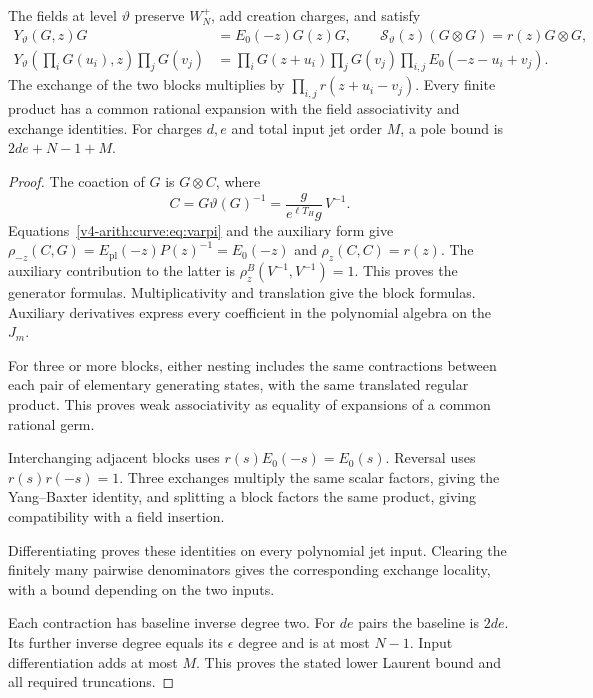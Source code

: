 \begin{theorem}\label{v4-arith:curve:thm:jet-fields}
The fields at level $\vartheta$ preserve $W_N^+$, add
creation charges, and satisfy
\begin{align}
 Y_\vartheta(G,z)G&=E_0(-z)G(z)G,\qquad
 \mathcal S_\vartheta(z)(G\otimes G)=r(z)G\otimes G,
       \label{v4-arith:curve:eq:jet-generator}\\
 Y_\vartheta\left(\prod_iG(u_i),z\right)\prod_jG(v_j)
 &=\prod_iG(z+u_i)\prod_jG(v_j)
       \prod_{i,j}E_0(-z-u_i+v_j).
       \label{v4-arith:curve:eq:jet-blocks}
\end{align}
The exchange of the two blocks multiplies by
$\prod_{i,j}r(z+u_i-v_j)$.
Every finite product has a common rational expansion with
the field associativity and exchange identities.
For charges $d,e$ and total input jet order $M$, a pole
bound is $2de+N-1+M$.
\end{theorem}
\begin{proof}
The coaction of $G$ is $G\otimes C$, where
\[
 C=G\vartheta(G)^{-1}
   =\frac{g}{e^{\ell T_H}g}\,V^{-1}.
\]
Equations~\eqref{v4-arith:curve:eq:varpi} and the auxiliary
form give
$\rho_{-z}(C,G)=E_{\mathrm{pl}}(-z)P(z)^{-1}=E_0(-z)$
and $\rho_z(C,C)=r(z)$.
The auxiliary contribution to the latter is
$\rho^B_z(V^{-1},V^{-1})=1$.
This proves the generator formulas.
Multiplicativity and translation give the block formulas.
Auxiliary derivatives express every coefficient in the
polynomial algebra on the $J_m$.

For three or more blocks, either nesting includes the same
contractions between each pair of elementary generating
states, with the same translated regular product.
This proves weak associativity as equality of expansions
of a common rational germ.

Interchanging adjacent blocks
uses $r(s)E_0(-s)=E_0(s)$.
Reversal uses $r(s)r(-s)=1$.
Three exchanges multiply the same scalar factors, giving
the Yang--Baxter identity, and splitting a block factors
the same product, giving compatibility with a field
insertion.

Differentiating proves these identities on
every polynomial jet input. Clearing the finitely many
pairwise denominators gives the corresponding exchange
locality, with a bound depending on the two inputs.

Each contraction has baseline inverse degree two.
For $de$ pairs the baseline is $2de$. Its further inverse
degree equals its $\epsilon$ degree and is at most $N-1$.
Input differentiation adds at most $M$. This proves the
stated lower Laurent bound and all required truncations.
\end{proof}

